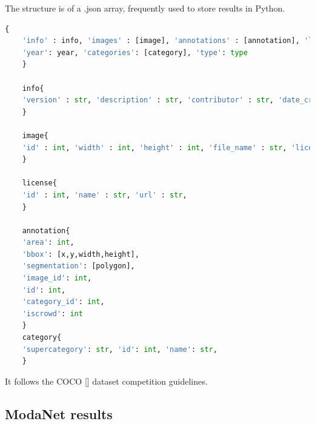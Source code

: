 The \modanet structure is of a .json array, frequently used to store results in Python.

\begin{lstlisting}[language=Python]
	{
	'info' : info, 'images' : [image], 'annotations' : [annotation], 'licenses' : [license],
	'year': year, 'categories': [category], 'type': type
	}
	
	info{
	'version' : str, 'description' : str, 'contributor' : str, 'date_created' : datetime,
	}
	
	image{
	'id' : int, 'width' : int, 'height' : int, 'file_name' : str, 'license' : int
	}
	
	license{
	'id' : int, 'name' : str, 'url' : str,
	}
	
	annotation{
	'area': int, 
	'bbox': [x,y,width,height],
	'segmentation': [polygon],
	'image_id': int,
	'id': int,
	'category_id': int,
	'iscrowd': int
	}
	category{
	'supercategory': str, 'id': int, 'name': str,
	}
\end{lstlisting}

It follows the COCO [] dataset competition guidelines.

\subsection{ModaNet results}\label{s:ds-modanet-rs}

